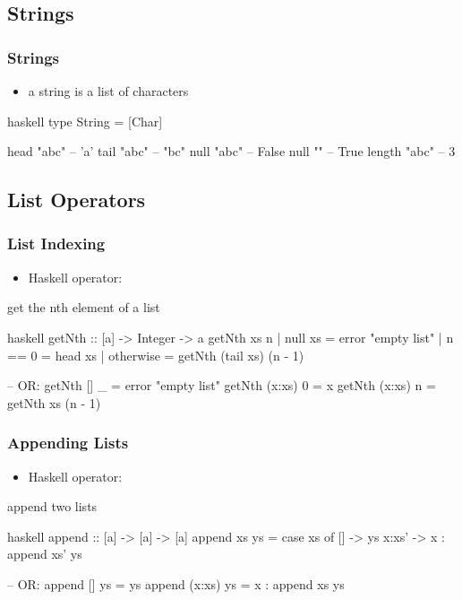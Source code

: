 \documentclass[dvipsnames]{beamer}
\theoremstyle{plain}
\begin{document}
\subsection{Strings}

\begin{frame}[fragile]
  \frametitle{Strings}

  \begin{itemize}
    \item a string is a list of characters
  \end{itemize}

  \begin{exampleblock}{}
    \begin{pygments}{haskell}
type String = [Char]

head "abc"              -- 'a'
tail "abc"              -- "bc"
null "abc"              -- False
null ""                 -- True
length "abc"            -- 3
    \end{pygments}
  \end{exampleblock}
\end{frame}

\subsection{List Operators}

\begin{frame}[fragile]
  \frametitle{List Indexing}

  \begin{itemize}
    \item Haskell operator: 
  \end{itemize}

  \begin{exampleblock}{get the nth element of a list}
    \begin{pygments}{haskell}
getNth :: [a] -> Integer -> a
getNth xs n
  | null xs   = error "empty list"
  | n == 0    = head xs
  | otherwise = getNth (tail xs) (n - 1)

-- OR:
getNth [] _ = error "empty list"
getNth (x:xs) 0 = x
getNth (x:xs) n = getNth xs (n - 1)
    \end{pygments}
  \end{exampleblock}
\end{frame}

\begin{frame}[fragile]
  \frametitle{Appending Lists}

  \begin{itemize}
    \item Haskell operator: 
  \end{itemize}

  \begin{exampleblock}{append two lists}
    \begin{pygments}{haskell}
append :: [a] -> [a] -> [a]
append xs ys =
    case xs of
      [] -> ys
      x:xs' -> x : append xs' ys

-- OR:
append [] ys = ys
append (x:xs) ys = x : append xs ys
    \end{pygments}
  \end{exampleblock}
\end{frame}
\end{document}
